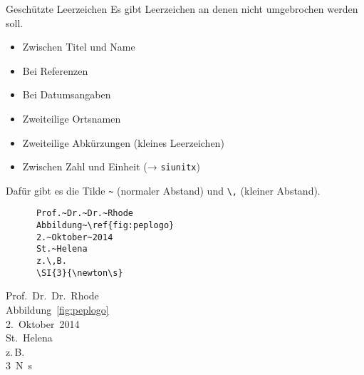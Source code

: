 \begin{frame}[fragile]{Geschützte Leerzeichen}
  Es gibt Leerzeichen an denen nicht umgebrochen werden soll. \\
  \begin{itemize}
    \item Zwischen Titel und Name
    \item Bei Referenzen
    \item Bei Datumsangaben
    \item Zweiteilige Ortsnamen
    \item Zweiteilige Abkürzungen (kleines Leerzeichen)
    \item Zwischen Zahl und Einheit (→ \texttt{siunitx})
  \end{itemize}
  Dafür gibt es die Tilde \lstinline!~! (normaler Abstand) und \lstinline!\,! (kleiner Abstand).
  \begin{CodeExample}{0.5}
    \begin{lstlisting}
      Prof.~Dr.~Dr.~Rhode
      Abbildung~\ref{fig:peplogo}
      2.~Oktober~2014
      St.~Helena
      z.\,B.
      \SI{3}{\newton\s}
    \end{lstlisting}
    \CodeResult
      \strut
      Prof.~Dr.~Dr.~Rhode \\
      Abbildung~\ref{fig:peplogo} \\
      2.~Oktober~2014 \\
      St.~Helena \\
      z.\,B. \\
      \SI{3}{\newton\s}
  \end{CodeExample}
\end{frame}

